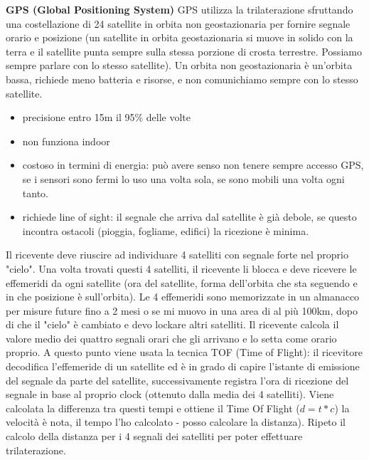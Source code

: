 \documentclass[12pt,italian]{report}
\begin{document}
\noindent \textbf{GPS (Global Positioning System)} 
\bigbreak
\noindent GPS utilizza la trilaterazione sfruttando una costellazione di 24 satellite in orbita non geostazionaria per fornire segnale orario e posizione (un satellite in orbita geostazionaria si muove in solido con la terra e il satellite punta sempre sulla stessa porzione di crosta terrestre. Possiamo sempre parlare con lo stesso satellite). Un orbita non geostazionaria è un'orbita bassa, richiede meno batteria e risorse, e non comunichiamo sempre con lo stesso satellite. 
\begin{itemize}
    \item precisione entro 15m il 95\% delle volte
    \item non funziona indoor
    \item costoso in termini di energia: può avere senso non tenere sempre accesso GPS, se i sensori sono fermi lo uso una volta sola, se sono mobili una volta ogni tanto. 
    \item richiede line of sight: il segnale che arriva dal satellite è già debole, se questo incontra ostacoli (pioggia, fogliame, edifici) la ricezione è minima. 
\end{itemize} 
Il ricevente deve riuscire ad individuare 4 satelliti con segnale forte nel proprio "cielo". Una volta trovati questi 4 satelliti, il ricevente li blocca e  deve ricevere le effemeridi da ogni satellite (ora del satellite, forma dell'orbita che sta seguendo e in che posizione è sull'orbita). 
\bigbreak
Le 4 effemeridi sono memorizzate in un almanacco per misure future fino a 2 mesi o se mi muovo in una area di al più 100km, dopo di che il "cielo" è cambiato e devo lockare altri satelliti. 
\bigbreak
Il ricevente calcola il valore medio dei quattro segnali orari che gli arrivano e lo setta come orario proprio. A questo punto viene usata la tecnica TOF (Time of Flight): il ricevitore decodifica l'effemeride di un satellite ed è in grado di capire l'istante di emissione del segnale da parte del satellite, successivamente registra l'ora di ricezione del segnale in base al proprio clock (ottenuto dalla media dei 4 satelliti). Viene calcolata la differenza tra questi tempi e ottiene il Time Of Flight ($d = t*c$) la velocità è nota, il tempo l'ho calcolato - posso calcolare la distanza). Ripeto il calcolo della distanza per i 4 segnali dei satelliti per poter effettuare trilaterazione.
\end{document}
